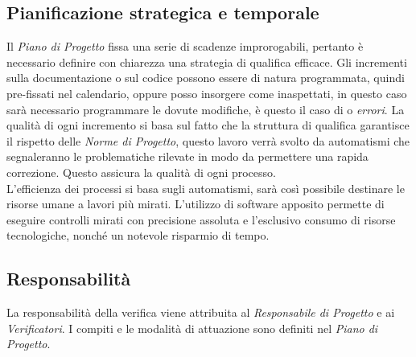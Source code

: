 	\subsection{Pianificazione strategica e temporale}
	Il \emph{Piano di Progetto} fissa una serie di scadenze improrogabili, pertanto è necessario definire con chiarezza una strategia di qualifica efficace. Gli incrementi sulla documentazione o sul codice possono essere di natura programmata, quindi pre-fissati nel calendario, oppure posso insorgere come inaspettati, in questo caso sarà necessario programmare le dovute modifiche, è questo il caso di  o \emph{errori}. La qualità di ogni incremento si basa sul fatto che la struttura di qualifica garantisce il rispetto delle \emph{Norme di Progetto}, questo lavoro verrà svolto da automatismi che segnaleranno le problematiche rilevate in modo da permettere una rapida correzione. Questo assicura la qualità di ogni processo. \\
	L'efficienza dei processi si basa sugli automatismi, sarà così possibile destinare le risorse umane a lavori più mirati. L'utilizzo di software apposito permette di eseguire controlli mirati con precisione assoluta e l'esclusivo consumo di risorse tecnologiche, nonché un notevole risparmio di tempo.
	
	\subsection{Responsabilità}
	La responsabilità della verifica viene attribuita al \emph{Responsabile di Progetto} e ai \emph{Verificatori}. I compiti e le modalità di attuazione sono definiti nel \emph{Piano di Progetto}.
	
